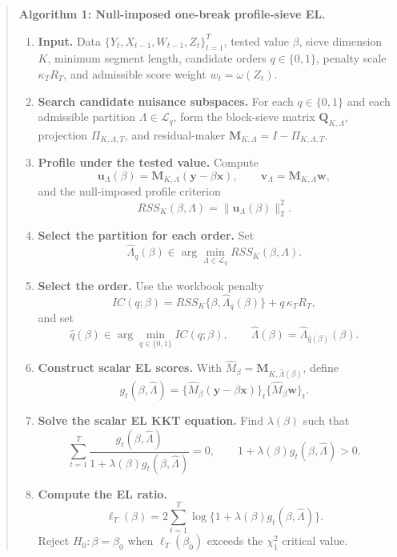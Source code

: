 \documentclass[12pt]{article}
\numberwithin{equation}{section}
\theoremstyle{definition}
\begin{document}
\begin{quote}
\noindent\textbf{Algorithm 1: Null-imposed one-break profile-sieve EL.}
\begin{enumerate}[leftmargin=2em]
\item \textbf{Input.} Data \(\{Y_t,X_{t-1},W_{t-1},Z_t\}_{t=1}^T\), tested value
\(\beta\), sieve dimension \(K\), minimum segment length, candidate orders
\(q\in\{0,1\}\), penalty scale \(\kappa_T R_T\), and admissible score weight
\(w_t=\omega(Z_t)\).

\item \textbf{Search candidate nuisance subspaces.} For each \(q\in\{0,1\}\)
and each admissible partition \(\Lambda\in\mathcal L_q\), form the block-sieve
matrix \(\bm Q_{K,\Lambda}\), projection
\(\Pi_{K,\Lambda,T}\), and residual-maker
\(\bm M_{K,\Lambda}=I-\Pi_{K,\Lambda,T}\).

\item \textbf{Profile under the tested value.} Compute
\[
    \bm u_\Lambda(\beta)=\bm M_{K,\Lambda}(\bm y-\beta\bm x),
    \qquad
    \bm v_\Lambda=\bm M_{K,\Lambda}\bm w,
\]
and the null-imposed profile criterion
\[
    RSS_K(\beta,\Lambda)=\|\bm u_\Lambda(\beta)\|_2^2.
\]

\item \textbf{Select the partition for each order.} Set
\[
    \widehat\Lambda_q(\beta)
    \in\arg\min_{\Lambda\in\mathcal L_q}RSS_K(\beta,\Lambda).
\]

\item \textbf{Select the order.} Use the workbook penalty
\[
    IC(q;\beta)
    =RSS_K\{\beta,\widehat\Lambda_q(\beta)\}
     +q\,\kappa_T R_T,
\]
and set
\[
    \widehat q(\beta)\in\arg\min_{q\in\{0,1\}}IC(q;\beta),
    \qquad
    \widehat\Lambda(\beta)=\widehat\Lambda_{\widehat q(\beta)}(\beta).
\]

\item \textbf{Construct scalar EL scores.} With
\(\widehat M_\beta=\bm M_{K,\widehat\Lambda(\beta)}\), define
\[
    g_t(\beta,\widehat\Lambda)
    =\{\widehat M_\beta(\bm y-\beta\bm x)\}_t
     \{\widehat M_\beta\bm w\}_t.
\]

\item \textbf{Solve the scalar EL KKT equation.} Find \(\lambda(\beta)\) such
that
\[
    \sum_{t=1}^T
    \frac{g_t(\beta,\widehat\Lambda)}
         {1+\lambda(\beta)g_t(\beta,\widehat\Lambda)}
    =0,
    \qquad
    1+\lambda(\beta)g_t(\beta,\widehat\Lambda)>0.
\]

\item \textbf{Compute the EL ratio.}
\[
    \ell_T(\beta)
    =2\sum_{t=1}^T
      \log\{1+\lambda(\beta)g_t(\beta,\widehat\Lambda)\}.
\]
Reject \(H_0:\beta=\beta_0\) when \(\ell_T(\beta_0)\) exceeds the
\(\chi_1^2\) critical value.
\end{enumerate}
\end{quote}
\end{document}
